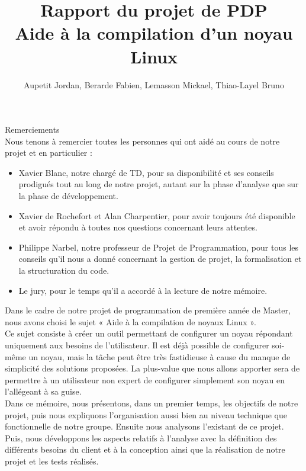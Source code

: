 \documentclass[17pts]{report}
\title{Rapport du projet de PDP \\ Aide à la compilation d'un noyau Linux}
\author{Aupetit Jordan, Berarde Fabien, Lemasson Mickael, Thiao-Layel Bruno}
\begin{document}
\maketitle
\clearpage
Remerciements\\

Nous tenons à remercier toutes les personnes qui ont aidé au cours de notre
projet et en particulier :\\

\begin{itemize}
  \item Xavier Blanc, notre chargé de TD, pour sa disponibilité et ses conseils
      prodigués tout au long de notre projet, autant sur la phase d'analyse que
      sur la phase de développement.
  \item Xavier de Rochefort et Alan Charpentier, pour avoir toujours été
      disponible et avoir répondu à toutes nos questions concernant leurs
      attentes.
  \item Philippe Narbel, notre professeur de Projet de Programmation, pour tous
      les conseils qu'il nous a donné concernant la gestion de projet, la
      formalisation et la structuration du code.
  \item Le jury, pour le temps qu'il a accordé à la lecture de notre mémoire.
\end{itemize}
\pagestyle{test}
\tableofcontents
\clearpage

\nocite{*}


\pagestyle{IHA-fancy-style}
Dans le cadre de notre projet de programmation de première année de Master,
nous avons choisi le sujet « Aide à la compilation de noyaux Linux ».  \\

Ce sujet consiste à créer un outil permettant de configurer un noyau répondant
uniquement aux besoins de l'utilisateur. Il est déjà possible de configurer
soi-même un noyau, mais la tâche peut être très fastidieuse à cause du manque
de simplicité des solutions proposées. La plus-value que nous allons apporter
sera de permettre à un utilisateur non expert de configurer simplement son
noyau en l'allégeant à sa guise.  \\

Dans ce mémoire, nous présentons, dans un premier temps, les objectifs de notre
projet, puis nous expliquons l’organisation aussi bien au niveau technique que
fonctionnelle de notre groupe. Ensuite nous analysons l'existant de ce projet.
\\

Puis, nous développons les aspects relatifs à l’analyse avec la définition des
différents besoins du client et à la conception ainsi que la réalisation de
notre projet et les tests réalisés.  \\
\end{document}
